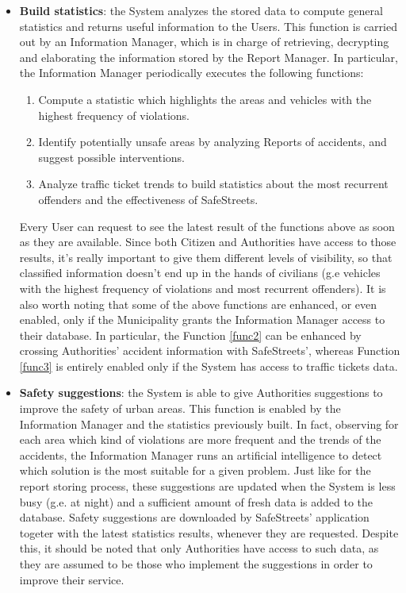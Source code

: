 \documentclass{report}
\begin{document}
\begin{itemize}
	\item \textbf{Build statistics}: the System analyzes the stored data to compute general statistics and returns useful information to the Users. This function is carried out by an Information Manager, which is in charge of retrieving, decrypting and elaborating the information stored by the Report Manager. In particular, the Information Manager periodically executes the following functions:
	\begin{enumerate}
		\item Compute a statistic which highlights the areas and vehicles with the highest frequency of violations.
		\item \label{func2} Identify potentially unsafe areas by analyzing Reports of accidents, and suggest possible interventions.
		\item \label{func3} Analyze traffic ticket trends to build statistics about the most recurrent offenders and the effectiveness of SafeStreets.
	\end{enumerate}
	Every User can request to see the latest result of the functions above as soon as they are available. Since both Citizen and Authorities have access to those results, it's really important to give them different levels of visibility, so that classified information doesn't end up in the hands of civilians (g.e vehicles with the highest frequency of violations and most recurrent offenders). It is also worth noting that some of the above functions are enhanced, or even enabled, only if the Municipality grants the Information Manager access to their database. In particular, the Function \ref{func2} can be enhanced by crossing Authorities' accident information with SafeStreets', whereas Function \ref{func3} is entirely enabled only if the System has access to traffic tickets data.

	\item \textbf{Safety suggestions}: the System is able to give Authorities suggestions to improve the safety of urban areas. This function is enabled by the Information Manager and the statistics previously built. In fact, observing for each area which kind of violations are more frequent and the trends of the accidents, the Information Manager runs an artificial intelligence to detect which solution is the most suitable for a given problem. Just like for the report storing process, these suggestions are updated when the System is less busy (g.e. at night) and a sufficient amount of fresh data is added to the database. Safety suggestions are downloaded by SafeStreets' application togeter with the latest statistics results, whenever they are requested. Despite this, it should be noted that only Authorities have access to such data, as they are assumed to be those who implement the suggestions in order to improve their service.
\end{itemize}
\end{document}
